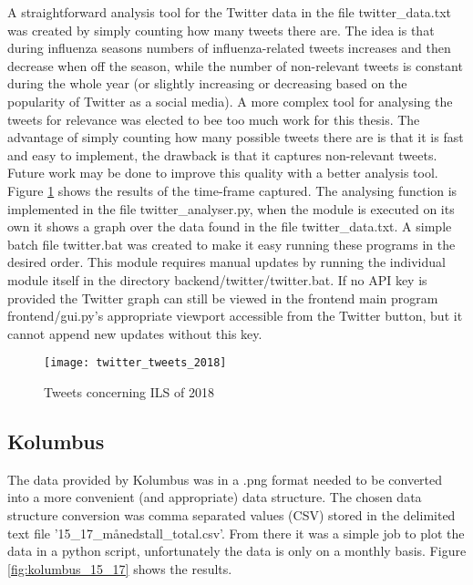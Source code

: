 A straightforward analysis tool for the Twitter data in the file twitter\_data.txt was created by simply counting how many tweets there are. The idea is that during influenza seasons numbers of influenza-related tweets increases and then decrease when off the season, while the number of non-relevant tweets is constant during the whole year (or slightly increasing or decreasing based on the popularity of Twitter as a social media). A more complex tool for analysing the tweets for relevance was elected to bee too much work for this thesis. The advantage of simply counting how many possible tweets there are is that it is fast and easy to implement, the drawback is that it captures non-relevant tweets. Future work may be done to improve this quality with a better analysis tool. Figure \ref{fig:twitterAnal} shows the results of the time-frame captured. The analysing function is implemented in the file twitter\_analyser.py, when the module is executed on its own it shows a graph over the data found in the file twitter\_data.txt. A simple batch file twitter.bat was created to make it easy running these programs in the desired order. This module requires manual updates by running the individual module itself in the directory backend/twitter/twitter.bat. If no API key is provided the Twitter graph can still be viewed in the frontend main program frontend/gui.py's appropriate viewport accessible from the Twitter button, but it cannot append new updates without this key.

\begin{figure}[ht]
\texttt{[image: twitter\_tweets\_2018]}
\centering
\caption{Tweets concerning ILS of 2018}
\label{fig:twitterAnal}
\end{figure}

\newpage







\subsection{Kolumbus}
The data provided by Kolumbus was in a .png format needed to be converted into a more convenient (and appropriate) data structure. The chosen data structure conversion was comma separated values (CSV) stored in the delimited text file '15\_17\_månedstall\_total.csv'. From there it was a simple job to plot the data in a python script, unfortunately the data is only on a monthly basis. Figure \ref{fig:kolumbus_15_17} shows the results.

